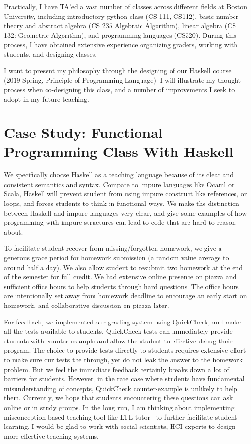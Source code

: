 \documentclass[11pt,a4paper,sans]{moderncv} %
\begin{document}
Practically, I have TA'ed a vast number of classes across different fields at Boston University, including introductory python class (CS 111, CS112), basic number theory and abstract algebra (CS 235 Algebraic Algorithm), linear algebra (CS 132: Geometric Algorithm), and programming languages (CS320).
During this process, I have obtained extensive experience organizing graders, working with students, and designing classes.

I want to present my philosophy through the designing of our Haskell course (2019 Spring, Principle of Programming Language). 
I will illustrate my thought process when co-designing this class, and a number of improvements I seek to adopt in my future teaching. 

\section{Case Study: Functional Programming Class With Haskell}

We specifically choose Haskell as a teaching language because of its clear and consistent semantics and syntax. 
Compare to impure languages like Ocaml or Scala, Haskell will prevent student from using impure construct like references, or loops, and forces students to think in functional ways.
We make the distinction between Haskell and impure languages very clear, and give some examples of how programming with impure structures can lead to code that are hard to reason about.

To facilitate student recover from missing/forgotten homework, we give a generous grace period for homework submission (a random value average to around half a day).
We also allow student to resubmit two homework at the end of the semester for full credit.
We had extensive online presence on piazza and sufficient office hours to help students through hard questions.
The office hours are intentionally set away from homework deadline to encourage an early start on homework, and collaborative discussion on piazza later.

For feedback, we implemented our grading system using QuickCheck, and make all the tests available to students. 
QuickCheck tests can immediately provide students with counter-example and allow the student to effective debug their program.
The choice to provide tests directly to students requires extensive effort to make sure our tests the through, yet do not leak the answer to the homework problem. 
But we feel the immediate feedback certainly breaks down a lot of barriers for students. 
However, in the rare case where students have fundamental misunderstanding of concepts, QuickCheck counter-example is unlikely to help them.
Currently, we hope that students encountering these questions can ask online or in study groups. 
In the long run, I am thinking about implementing misconception-based teaching tool like LTL tutor~\cite{plt_LTLTutor_2024} to further facilitate student learning.
I would be glad to work with social scientists, HCI experts to design more effective teaching systems.
\end{document}
